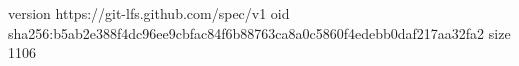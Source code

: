 version https://git-lfs.github.com/spec/v1
oid sha256:b5ab2e388f4dc96ee9cbfac84f6b88763ca8a0c5860f4edebb0daf217aa32fa2
size 1106
